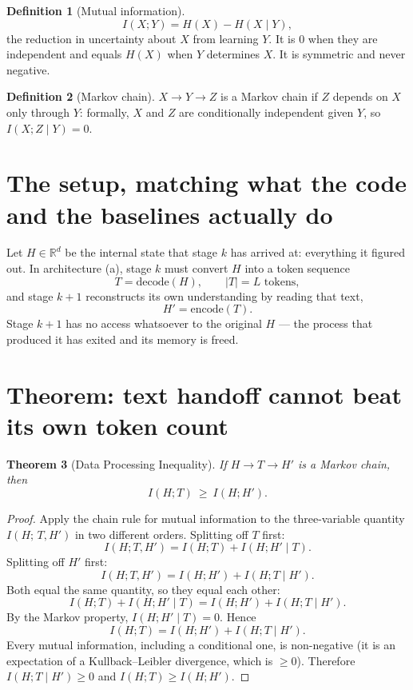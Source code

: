 \documentclass[11pt]{article}
\newtheorem{theorem}{Theorem}
\theoremstyle{definition}
\newtheorem{definition}[theorem]{Definition}
\begin{document}
\begin{definition}[Mutual information]
\[
I(X;Y) = H(X) - H(X\mid Y),
\]
the reduction in uncertainty about $X$ from learning $Y$. It is $0$ when they are independent and equals $H(X)$ when $Y$ determines $X$. It is symmetric and never negative.
\end{definition}

\begin{definition}[Markov chain]
$X \to Y \to Z$ is a Markov chain if $Z$ depends on $X$ only through $Y$: formally, $X$ and $Z$ are conditionally independent given $Y$, so $I(X;Z\mid Y)=0$.
\end{definition}

\section{The setup, matching what the code and the baselines actually do}

Let $H \in \mathbb{R}^{d}$ be the internal state that stage $k$ has arrived at: everything it figured out. In architecture (a), stage $k$ must convert $H$ into a token sequence
\[
T = \mathrm{decode}(H),\qquad |T| = L \text{ tokens},
\]
and stage $k+1$ reconstructs its own understanding by reading that text,
\[
H' = \mathrm{encode}(T).
\]
Stage $k+1$ has no access whatsoever to the original $H$ --- the process that produced it has exited and its memory is freed.

\begin{center}
\end{center}

\section{Theorem: text handoff cannot beat its own token count}

\begin{theorem}[Data Processing Inequality]
\label{thm:dpi}
If $H \to T \to H'$ is a Markov chain, then
\[
I(H;T) \ \ge\ I(H;H').
\]
\end{theorem}

\begin{proof}
Apply the chain rule for mutual information to the three-variable quantity $I(H;\,T,H')$ in two different orders. Splitting off $T$ first:
\[
I(H;T,H') = I(H;T) + I(H;H'\mid T).
\]
Splitting off $H'$ first:
\[
I(H;T,H') = I(H;H') + I(H;T\mid H').
\]
Both equal the same quantity, so they equal each other:
\[
I(H;T) + I(H;H'\mid T) = I(H;H') + I(H;T\mid H').
\]
By the Markov property, $I(H;H'\mid T)=0$. Hence
\[
I(H;T) = I(H;H') + I(H;T\mid H').
\]
Every mutual information, including a conditional one, is non-negative (it is an expectation of a Kullback--Leibler divergence, which is $\ge 0$). Therefore $I(H;T\mid H')\ge 0$ and $I(H;T) \ge I(H;H')$.
\end{proof}
\end{document}
